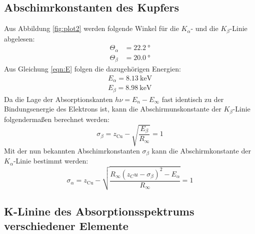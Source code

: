 \subsection{Abschimrkonstanten des Kupfers}

Aus Abbildung \ref{fig:plot2} werden folgende Winkel für die $K_\alpha$- und die $K_\beta$-Linie abgelesen:
\begin{align*}
  \Theta_\alpha &= \SI{22.2}{\degree} \\
  \Theta_\beta &= \SI{20.0}{\degree}
\end{align*}
Aus Gleichung \eqref{eqn:E} folgen die dazugehörigen Energien:
\begin{align*}
  E_\alpha = \SI{8.13}{\kilo\eV} \\
  E_\beta = \SI{8.98}{\kilo\eV}
\end{align*}
Da die Lage der Absorptionskanten $h\nu = E_n - E_\infty$ fast identisch zu der Bindungsenergie des Elektrons ist,
kann die Abschirmunskonstante der $K_\beta$-Linie folgendermaßen berechnet werden:
\begin{equation*}
  \sigma_\beta = z_\text{Cu} - \sqrt{\frac{E_\beta}{R_\infty}} = 1
\end{equation*}
Mit der nun bekannten Abschimrkonstanten $\sigma_\beta$ kann die Abschirmkonstante der $K_\alpha$-Linie bestimmt werden:
\begin{equation*}
  \sigma_\alpha = z_\text{Cu} - \sqrt{\frac{R_\infty (z_Cu-\sigma_\beta)^2 - E_\alpha}{R_\infty}} = 1
\end{equation*}

\subsection{K-Linine des Absorptionsspektrums verschiedener Elemente}

